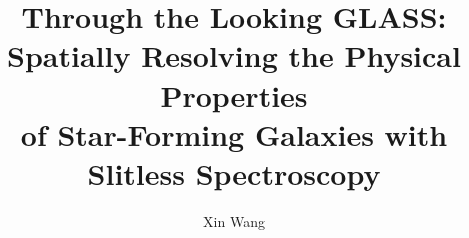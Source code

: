 \documentclass[PhD]{uclathes}
\title          {Through the Looking GLASS: \\
                Spatially Resolving the Physical Properties \\
                of Star-Forming Galaxies with Slitless Spectroscopy}
\author         {Xin Wang}
\begin{document}
\makeintropages

%




\end{document}
